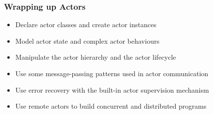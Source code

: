 \documentclass[aspectratio=169]{beamer}
\begin{document}
\begin{frame}[t]\frametitle{Wrapping up Actors}
    \begin{itemize}
      \item Declare \alert{actor classes} and create \alert{actor instances}
      \item Model \alert{actor state} and complex \alert{actor behaviours}
      \item Manipulate the \alert{actor hierarchy} and the \alert{actor lifecycle}
      \item Use some message-passing patterns used in \alert{actor communication}
      \item Use error recovery with the built-in \alert{actor supervision} mechanism
      \item Use \alert{remote actors} to build concurrent and distributed programs
    \end{itemize}

\end{frame}
\end{document}
